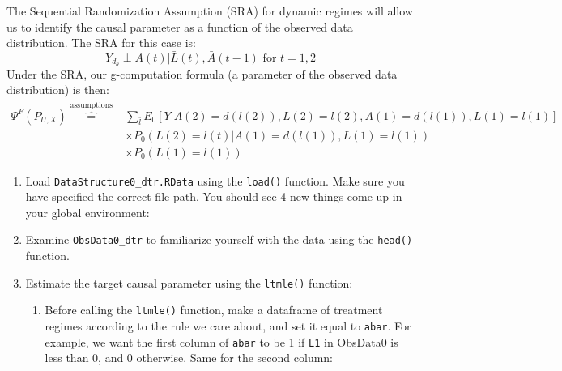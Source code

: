 \documentclass{exam}
\newenvironment{packed_enum}{
\begin{enumerate}
 \setlength{\itemsep}{0pt}
  \setlength{\parskip}{0pt}
  \setlength{\parsep}{0pt}
}{\end{enumerate}}
\begin{document}
The Sequential Randomization Assumption (SRA) for dynamic regimes will allow us to identify the causal parameter as a function of the observed data distribution. The SRA for this case is:
\[
Y_{d_\theta} \perp A(t) | \bar{L}(t), \bar{A}(t-1) \text{ for } t = 1, 2
\]
Under the SRA, our g-computation formula (a parameter of the observed data distribution) is then:
\begin{align*}
\Psi^F(P_{U,X}) \overbrace{=}^{\text{assumptions}} & \sum_{\bar{l}} E_0[Y|A(2) = d(l(2)), L(2) = l(2), A(1) = d(l(1)), L(1) = l(1)]\\
&\times P_0(L(2) = l(t)|A(1) = d(l(1)), L(1) = l(1)) \\
& \times P_0(L(1) = l(1))
\end{align*}


\begin{enumerate}
\item Load \texttt{DataStructure0\_dtr.RData} using the \texttt{load()} function. Make sure you have specified the correct file path. You should see 4 new things come up in your global environment:
\item Examine \texttt{ObsData0\_dtr} to familiarize yourself with the data using the \texttt{head()} function.
\item Estimate the target causal parameter using the \texttt{ltmle()} function:
\begin{enumerate}
\item Before calling the \texttt{ltmle()} function, make a dataframe of treatment regimes according to the rule we care about, and set it equal to \texttt{abar}. For example, we want the first column of \texttt{abar} to be 1 if \texttt{L1} in ObsData0 is less than 0, and 0 otherwise. Same for the second column:

\end{enumerate}
\end{enumerate}
\end{document}
